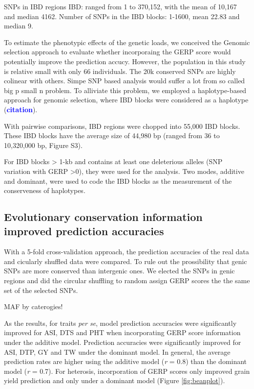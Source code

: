 \documentclass[9pt,twocolumn,twoside]{gsajnl}
\newcommand{\yang}[1]{\textcolor{blue}{\bf #1}}
\begin{document}
SNPs in IBD regions
IBD: ranged from 1 to 370,152, with the mean of 10,167 and median 4162.
Number of SNPs in the IBD blocks: 1-1600, mean 22.83 and median 9.



To estimate the phenotypic effects of the genetic loads, we conceived the Genomic selection approach to evaluate whether incorporaing the GERP score would potentially improve the prediction accucy. However, the population in this study is relative small with only 66 individuals. The 20k conserved SNPs are highly colinear with others. Simpe SNP based analysis would suffer a lot from so called big p small n problem. To alliviate this problem, we employed a haplotype-based approach for genomic selection, where IBD blocks were considered as a haplotype (\yang{citation}).

With pairwise comparisons, IBD regions were chopped into 55,000 IBD blocks. These IBD blocks have the average size of 44,980 bp (ranged from 36 to 10,320,000 bp, Figure S3). 

For IBD blocks > 1-kb and contains at least one deleterious alleles (SNP variation with GERP >0), they were used for the analysis. Two modes, additive and dominant, were used to code the IBD blocks as the measurement of the conserveness of haplotypes.  


\subsection*{Evolutionary conservation information improved prediction accuracies}




With a 5-fold cross-validation approach, the prediction accuracies of the real data and cicularly shuffled data were compared. To rule out the prossibility that genic SNPs are more conserved than intergenic ones. We elected the SNPs in genic regions and did the circular shuffling to random assign GERP scores the the same set of the selected SNPs.

MAF by caterogies!

As the results, for traits \emph{per se}, model prediction accuracies were significantly improved for ASI, DTS and PHT when incorporating GERP score information under the additive model. Prediction accuracies were significantly improved for ASI, DTP, GY and TW under the dominant model. In general, the average prediction rates are higher using the additive model (\emph{r} = 0.8) than the dominant model (\emph{r} = 0.7). For heterosis, incorporation of GERP scores only improved grain yield prediction and only under a dominant model (Figure \ref{fig:beanplot}).  
\end{document}
